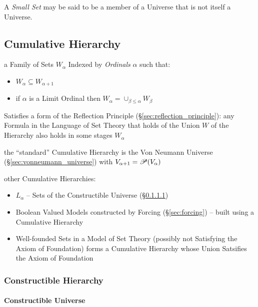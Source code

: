 A \emph{Small Set} may be said to be a member of a Universe that is
not itself a Universe.



\subsection{Cumulative Hierarchy}\label{sec:cumulative_hierarchy}

a Family of Sets $W_\alpha$ Indexed by \emph{Ordinals} $\alpha$ such
that:
\begin{itemize}
  \item $W_\alpha \subseteq W_{\alpha+1}$
  \item if $\alpha$ is a Limit Ordinal then $W_\alpha = \cup_{\beta
    \leq \alpha} W_\beta$
\end{itemize}

Satisfies a form of the Reflection Principle
(\S\ref{sec:reflection_principle}): any Formula in the Language of Set
Theory that holds of the Union $W$ of the Hierarchy also holds in some
stages $W_\alpha$

the ``standard'' Cumulative Hierarchy is the Von Neumann Universe
(\S\ref{sec:vonneumann_universe}) with $V_{\alpha+1} = \mathscr{P}(V_\alpha)$

other Cumulative Hierarchies:
\begin{itemize}
  \item $L_\alpha$ -- Sets of the Constructible Universe
    (\S\ref{sec:constructible_universe})
  \item Boolean Valued Models constructed by Forcing
    (\S\ref{sec:forcing}) -- built using a Cumulative Hierarchy
  \item Well-founded Sets in a Model of Set Theory (possibly not
    Satisfying the Axiom of Foundation) forms a Cumulative Hierarchy
    whose Union Satsifies the Axiom of Foundation
\end{itemize}



\subsubsection{Constructible Hierarchy}\label{sec:constructible_hierarchy}

\paragraph{Constructible Universe}\label{sec:constructible_universe}\hfill

